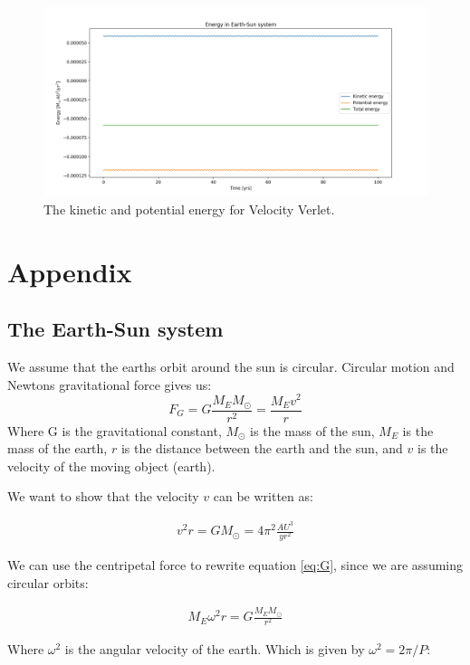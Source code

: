 \documentclass{article}
\begin{document}
\begin{figure}[H]
	\centering
	\includegraphics[width=120mm]{Energy}
	\caption{The kinetic and potential energy for Velocity Verlet.}
	\label{fig:Energy}
\end{figure}


\section{Appendix} %
\subsection{The Earth-Sun system}
We assume that the earths orbit around the sun is circular. Circular motion and Newtons gravitational force gives us:
\begin{equation}
    F_G=G\frac{M_EM_{\odot}}{r^2}=\frac{M_Ev^2}{r}
    \label{eq:G}
\end{equation}
Where G is the gravitational constant, $M_\odot$ is the mass of the sun, $M_E$ is the mass of the earth, $r$ is the distance between the earth and the sun, and $v$ is the velocity of the moving object (earth). 

We want to show that the velocity $v$ can be written as:

\begin{align}
    v^2r=GM_{\odot}=4\pi^2\frac{AU^3}{yr^2}
    \label{eq:vr}
\end{align}

We can use the centripetal force to rewrite equation \ref{eq:G}, since we are assuming circular orbits:

\begin{align*}
    M_E\omega^2r=G\frac{M_EM_{\odot}}{r^2}
\end{align*}

Where $\omega^2$ is the angular velocity of the earth. Which is given by $\omega^2=2\pi / P$: 
\end{document}
